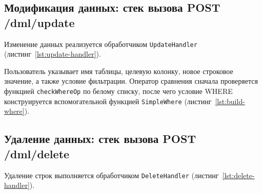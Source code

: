 \begin{listing}[H]
    \caption{Сборка и выполнение пакетного запроса \texttt{INSERT INTO}}
    \label{lst:exec-insert}
\end{listing}

\subsection{Модификация данных: стек вызова POST /dml/update}

Изменение данных реализуется обработчиком \texttt{UpdateHandler} (листинг~\ref{lst:update-handler}).

\begin{listing}[H]
    \caption{Конструирование и выполнение команды \texttt{UPDATE}}
    \label{lst:update-handler}
\end{listing}

Пользователь указывает имя таблицы, целевую колонку, новое строковое значение, а также условие фильтрации. Оператор сравнения сначала проверяется функцией \texttt{checkWhereOp} по белому списку, после чего условие WHERE конструируется вспомогательной функцией \texttt{SimpleWhere} (листинг~\ref{lst:build-where}).

\begin{listing}[H]
    \caption{Конструирование предиката WHERE в \texttt{db.go}}
    \label{lst:build-where}
\end{listing}

\subsection{Удаление данных: стек вызова POST /dml/delete}

Удаление строк выполняется обработчиком \texttt{DeleteHandler} (листинг~\ref{lst:delete-handler}).

\begin{listing}[H]
    \caption{Конструирование и выполнение команды \texttt{DELETE FROM}}
    \label{lst:delete-handler}
\end{listing}